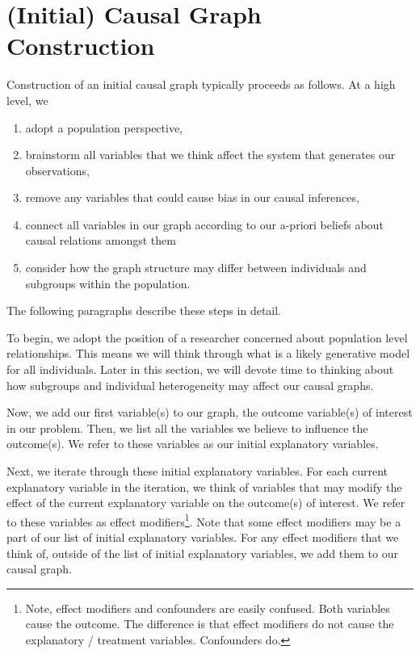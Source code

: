 \section{(Initial) Causal Graph Construction}
\label{sec:graph-construction}

Construction of an initial causal graph typically proceeds as follows.
At a high level, we
\begin{enumerate}
   \item adopt a population perspective,
   \item brainstorm all variables that we think affect the system that generates our observations,
   \item remove any variables that could cause bias in our causal inferences,
   \item connect all variables in our graph according to our a-priori beliefs about causal relations amongst them
   \item consider how the graph structure may differ between individuals and subgroups within the population.
\end{enumerate}
The following paragraphs describe these steps in detail.

To begin, we adopt the position of a researcher concerned about population level relationships.
This means we will think through what is a likely generative model for all individuals.
Later in this section, we will devote time to thinking about how subgroups and individual heterogeneity may affect our causal graphs.

Now, we add our first variable(s) to our graph, the outcome variable(s) of interest in our problem.
Then, we list all the variables we believe to influence the outcome(s).
We refer to these variables as our initial explanatory variables.

Next, we iterate through these initial explanatory variables.
For each current explanatory variable in the iteration, we think of variables that may modify the effect of the current explanatory variable on the outcome(s) of interest.
We refer to these variables as effect modifiers\footnote{Note, effect modifiers and confounders are easily confused. Both variables cause the outcome. The difference is that effect modifiers do not cause the explanatory / treatment variables. Confounders do.}.
Note that some effect modifiers may be a part of our list of initial explanatory variables.
For any effect modifiers that we think of, outside of the list of initial explanatory variables, we add them to our causal graph.


